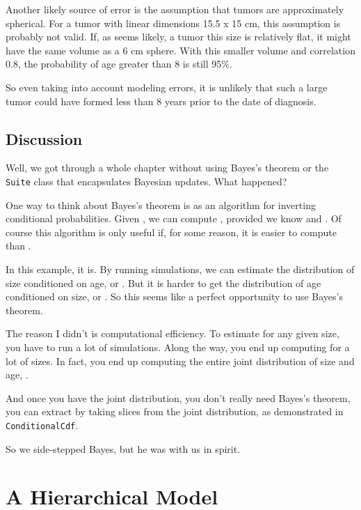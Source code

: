\documentclass[12pt]{book}
\theoremstyle{exercise}
\begin{document}
Another likely source of error is the assumption that tumors are
approximately spherical.  For a tumor with linear dimensions 15.5 x 15
cm, this assumption is probably not valid.  If, as seems likely, a
tumor this size
is relatively flat, it might have the same volume as a 6 cm sphere.
With this smaller volume and correlation 0.8, the probability of age
greater than 8 is still 95\%.

So even taking into account modeling errors, it is unlikely that such
a large tumor could have formed less than 8 years prior to the date of
diagnosis.


\section{Discussion}

Well, we got through a whole chapter without using Bayes's theorem or
the {\tt Suite} class that encapsulates Bayesian updates.  What
happened?

One way to think about Bayes's theorem is as an algorithm for
inverting conditional probabilities.  Given , we can compute
, provided we know  and .  Of course this algorithm
is only useful if, for some reason, it is easier to compute 
than .

In this example, it is.  By running simulations, we can estimate the
distribution of size conditioned on age, or .  But it is
harder to get the distribution of age conditioned on size, or
.  So this seems like a perfect opportunity to use Bayes's
theorem.

The reason I didn't is computational efficiency.  To estimate
 for any given size, you have to run a lot of simulations.
Along the way, you end up computing  for a lot of sizes.
In fact, you end up computing the entire joint distribution of size
and age, .

And once you have the joint distribution, you don't really need
Bayes's theorem, you can extract  by taking slices from
the joint distribution, as demonstrated in {\tt ConditionalCdf}.

So we side-stepped Bayes, but he was with us in spirit.


\chapter{A Hierarchical Model}
\label{hierarchical}
\end{document}
